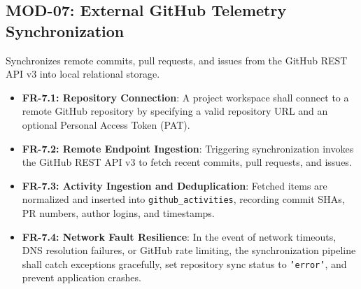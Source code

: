 \documentclass{scrreprt}
\begin{document}
\subsection{MOD-07: External GitHub Telemetry Synchronization}
Synchronizes remote commits, pull requests, and issues from the GitHub REST API v3 into local relational storage.
\begin{itemize}
    \item \textbf{FR-7.1: Repository Connection}: A project workspace shall connect to a remote GitHub repository by specifying a valid repository URL and an optional Personal Access Token (PAT).
    \item \textbf{FR-7.2: Remote Endpoint Ingestion}: Triggering synchronization invokes the GitHub REST API v3 to fetch recent commits, pull requests, and issues.
    \item \textbf{FR-7.3: Activity Ingestion and Deduplication}: Fetched items are normalized and inserted into \texttt{github\_activities}, recording commit SHAs, PR numbers, author logins, and timestamps.
    \item \textbf{FR-7.4: Network Fault Resilience}: In the event of network timeouts, DNS resolution failures, or GitHub rate limiting, the synchronization pipeline shall catch exceptions gracefully, set repository sync status to \texttt{'error'}, and prevent application crashes.
\end{itemize}
\end{document}
